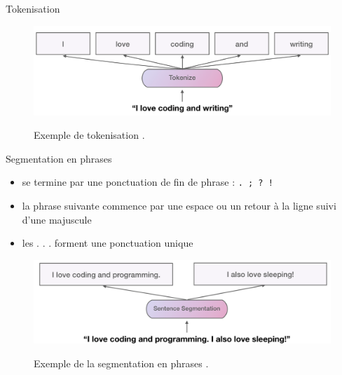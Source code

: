 \documentclass[xetex,xcolor={table,usenames,dvipsnames}]{beamer}
\begin{document}
\begin{frame}{Tokenisation}
	\begin{figure}[h] %
		\centering
		\includegraphics[width=\linewidth]{img/tokenisation.png}
		\label{fig:evolution}
		\caption{Exemple de tokenisation \citep{saravia}.}
	\end{figure}
\end{frame}

\begin{frame}{Segmentation en phrases}
	\begin{itemize}
		\item se termine par une ponctuation de fin de phrase : \texttt{. ; ? !}
		\item la phrase suivante commence par une espace ou un retour à la ligne suivi d’une majuscule
		\item les . . . forment une ponctuation unique
	\end{itemize}
		\begin{figure}[h] %
		\centering
		\includegraphics[width=\linewidth]{img/segmentation_phrases.png}
		\label{fig:evolution}
		\caption{Exemple de la segmentation en phrases \citep{saravia}.}
	\end{figure}
\end{frame}
\end{document}
